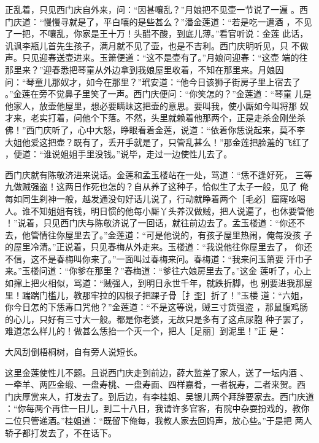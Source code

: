 正乱着，只见西门庆自外来，问：“因甚嚷乱？”月娘把不见壶一节说了一遍
。西门庆道：“慢慢寻就是了，平白嚷的是些甚么？”潘金莲道：“若是吃一遭酒
，不见了一把，不嚷乱，你家是王十万！头醋不酸，到底儿薄。”看官听说：金莲
此话，讥讽李瓶儿首先生孩子，满月就不见了壶，也是不吉利。西门庆明听见，只
不做声。只见迎春送壶进来。玉箫便道：“这不是壶有了。”月娘问迎春：“这壶
端的往那里来？”迎春悉把琴童从外边拿到我娘屋里收着，不知在那里来。月娘因
问：“琴童儿那奴才，如今在那里？”玳安道：“他今日该狮子街房子里上宿去了
。”金莲在旁不觉鼻子里笑了一声。西门庆便问：“你笑怎的？”金莲道：“琴童
儿是他家人，放壶他屋里，想必要瞒昧这把壶的意思。要叫我，使小厮如今叫将那
奴才来，老实打着，问他个下落。不然，头里就赖着他那两个，正是走杀金刚坐杀
佛！”西门庆听了，心中大怒，睁眼看着金莲，说道：“依着你恁说起来，莫不李
大姐他爱这把壶？既有了，丢开手就是了，只管乱甚么！”那金莲把脸羞的飞红了
，便道：“谁说姐姐手里没钱。”说毕，走过一边使性儿去了。

西门庆就有陈敬济进来说话。金莲和孟玉楼站在一处，骂道：“恁不逢好死，
三等九做贼强盗！这两日作死也怎的？自从养了这种子，恰似生了太子一般，见了
俺每如同生刹神一般，越发通没句好话儿说了，行动就睁着两个［毛必］窟窿吆喝
人。谁不知姐姐有钱，明日惯的他每小厮丫头养汉做贼，把人说遍了，也休要管他
！”说着，只见西门庆与陈敬济说了一回话，就往前边去了。孟玉楼道：“你还不
去，他管情往你屋里去了。”金莲道：“可是他说的，有孩子屋里热闹，俺每没孩
子的屋里冷清。”正说着，只见春梅从外走来。玉楼道：“我说他往你屋里去了，
你还不信，这不是春梅叫你来了。”一面叫过春梅来问。春梅道：“我来问玉箫要
汗巾子来。”玉楼问道：“你爹在那里？”春梅道：“爹往六娘房里去了。”这金
莲听了，心上如撺上把火相似，骂道：“贼强人，到明日永世千年，就跌折脚，也
别要进我那屋里！踹踹门槛儿，教那牢拉的囚根子把踝子骨［扌歪］折了！”玉楼
道：“六姐，你今日怎的下恁毒口咒他？”金莲道：“不是这等说，贼三寸货强盗
，那鼠腹鸡肠的心儿，只好有三寸大一般。都是你老婆，无故只是多有了这点尿胞
种子罢了，难道怎么样儿的！做甚么恁抬一个灭一个，把人［足丽］到泥里！”正
是：

大风刮倒梧桐树，自有旁人说短长。

这里金莲使性儿不题。且说西门庆走到前边，薛大监差了家人，送了一坛内酒
、一牵羊、两匹金缎、一盘寿桃、一盘寿面、四样嘉肴，一者祝寿，二者来贺。西
门庆厚赏来人，打发去了。到后边，有李桂姐、吴银儿两个拜辞要家去。西门庆道
：“你每两个再住一日儿，到二十八日，我请许多官客，有院中杂耍扮戏的，教你
二位只管递酒。”桂姐道：“既留下俺每，我教人家去回妈声，放心些。”于是把
两人轿子都打发去了，不在话下。

